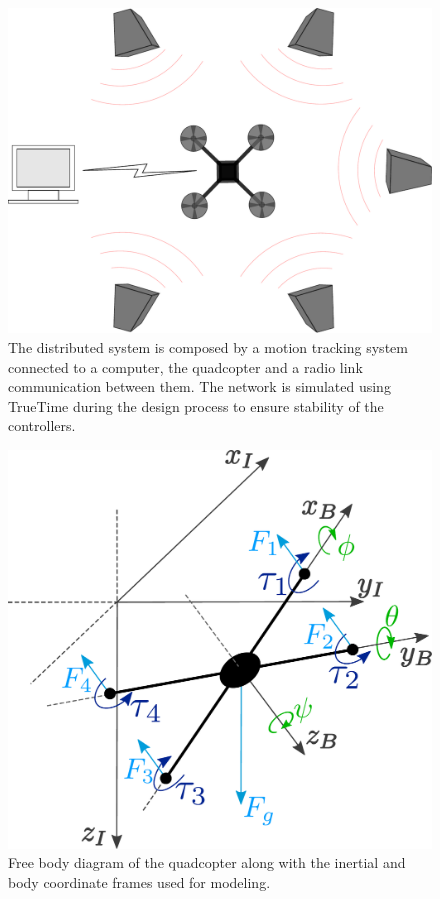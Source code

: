 \begin{figure}
\includegraphics[width=0.8\linewidth]{figures/system.pdf}
\caption{The distributed system is composed by a motion tracking system connected to a computer, the quadcopter and a radio link communication between them. The network is simulated using TrueTime during the design process to ensure stability of the controllers.}
\end{figure}
\vspace{-1cm}
\begin{figure}
\includegraphics[width=0.8\linewidth]{figures/droneDiagram.pdf}
\caption{Free body diagram of the quadcopter along with the inertial and body coordinate frames used for modeling.}
\end{figure}